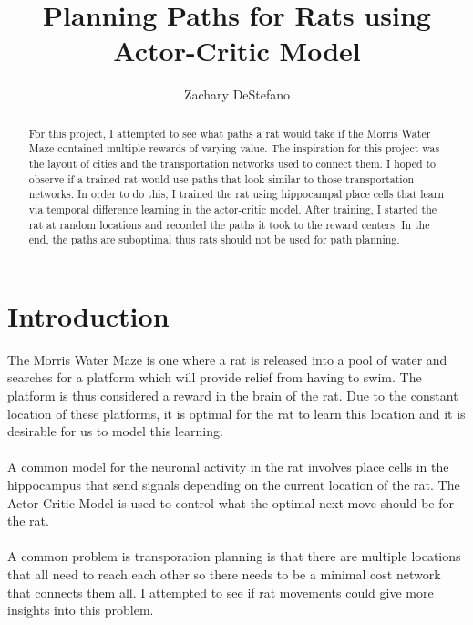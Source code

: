 \documentclass[conference]{IEEEtran}
\begin{document}
\title{Planning Paths for Rats using Actor-Critic Model}


\author{Zachary DeStefano}

\maketitle


\begin{abstract}
For this project, I attempted to see what paths a rat would take if the Morris Water Maze contained multiple rewards of varying value. The inspiration for this project was the layout of cities and the transportation networks used to connect them. I hoped to observe if a trained rat would use paths that look similar to those transportation networks. In order to do this, I trained the rat using hippocampal place cells that learn via temporal difference learning in the actor-critic model. After training, I started the rat at random locations and recorded the paths it took to the reward centers. In the end, the paths are suboptimal thus rats should not be used for path planning. 
\end{abstract}

\IEEEpeerreviewmaketitle



\section{Introduction}

The Morris Water Maze is one where a rat is released into a pool of water and searches for a platform which will provide relief from having to swim. The platform is thus considered a reward in the brain of the rat. Due to the constant location of these platforms, it is optimal for the rat to learn this location and it is desirable for us to model this learning.\\
\\
A common model for the neuronal activity in the rat involves place cells in the hippocampus that send signals depending on the current location of the rat. The Actor-Critic Model is used to control what the optimal next move should be for the rat. \\
\\
A common problem is transporation planning is that there are multiple locations that all need to reach each other so there needs to be a minimal cost network that connects them all. I attempted to see if rat movements could give more insights into this problem. \\
\end{document}
